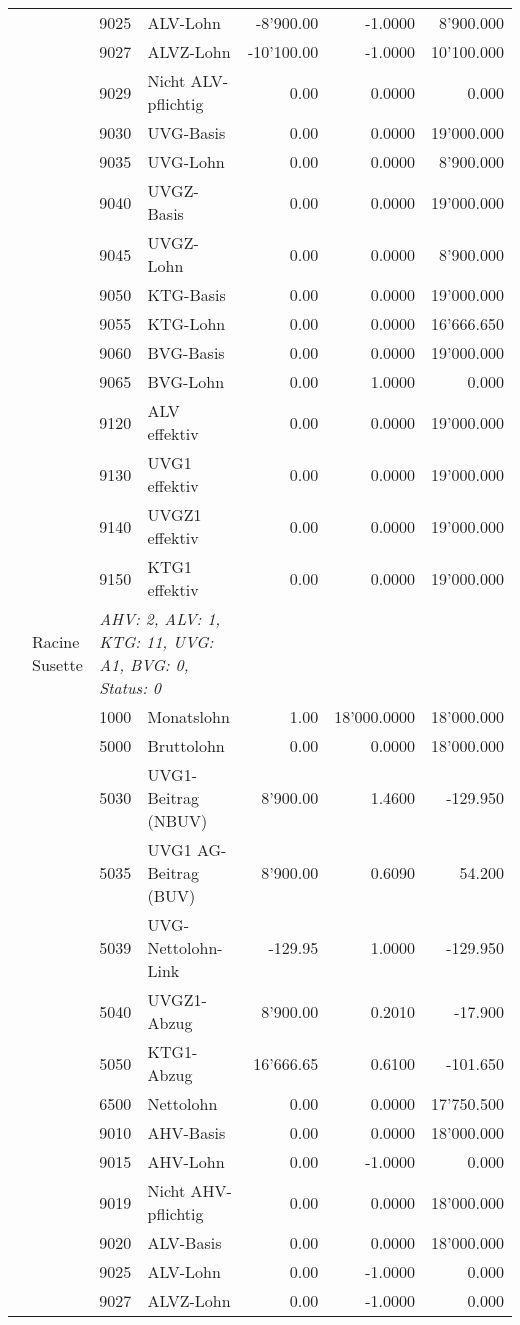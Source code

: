 \documentclass[15pt,a4paper]{article}
\begin{document}
\begin{longtable}{@{\extracolsep{\fill}}l l l l|r|r|r}
&&9025&ALV-Lohn&-8'900.00&-1.0000&8'900.000\\
&&9027&ALVZ-Lohn&-10'100.00&-1.0000&10'100.000\\
&&9029&Nicht ALV-pflichtig&0.00&0.0000&0.000\\
&&9030&UVG-Basis&0.00&0.0000&19'000.000\\
&&9035&UVG-Lohn&0.00&0.0000&8'900.000\\
&&9040&UVGZ-Basis&0.00&0.0000&19'000.000\\
&&9045&UVGZ-Lohn&0.00&0.0000&8'900.000\\
&&9050&KTG-Basis&0.00&0.0000&19'000.000\\
&&9055&KTG-Lohn&0.00&0.0000&16'666.650\\
&&9060&BVG-Basis&0.00&0.0000&19'000.000\\
&&9065&BVG-Lohn&0.00&1.0000&0.000\\
&&9120&ALV effektiv&0.00&0.0000&19'000.000\\
&&9130&UVG1 effektiv&0.00&0.0000&19'000.000\\
&&9140&UVGZ1 effektiv&0.00&0.0000&19'000.000\\
&&9150&KTG1 effektiv&0.00&0.0000&19'000.000\\
\pagebreak
28&Racine Susette&\multicolumn{2}{l|}{\small\emph{AHV: 2, ALV: 1, KTG: 11, UVG: A1, BVG: 0, Status: 0}}&& \\
&&1000&Monatslohn&1.00&18'000.0000&18'000.000\\
&&5000&Bruttolohn&0.00&0.0000&18'000.000\\
&&5030&UVG1-Beitrag (NBUV)&8'900.00&1.4600&-129.950\\
&&5035&UVG1 AG-Beitrag (BUV)&8'900.00&0.6090&54.200\\
&&5039&UVG-Nettolohn-Link&-129.95&1.0000&-129.950\\
&&5040&UVGZ1-Abzug&8'900.00&0.2010&-17.900\\
&&5050&KTG1-Abzug&16'666.65&0.6100&-101.650\\
&&6500&Nettolohn&0.00&0.0000&17'750.500\\
&&9010&AHV-Basis&0.00&0.0000&18'000.000\\
&&9015&AHV-Lohn&0.00&-1.0000&0.000\\
&&9019&Nicht AHV-pflichtig&0.00&0.0000&18'000.000\\
&&9020&ALV-Basis&0.00&0.0000&18'000.000\\
&&9025&ALV-Lohn&0.00&-1.0000&0.000\\
&&9027&ALVZ-Lohn&0.00&-1.0000&0.000\\

\end{longtable}
\end{document}
